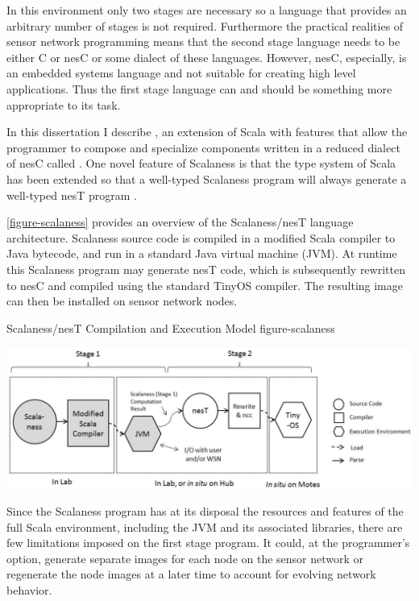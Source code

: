 In this environment only two stages are necessary so a language that provides an arbitrary
number of stages is not required. Furthermore the practical realities of sensor network
programming means that the second stage language needs to be either C or nesC or some dialect of
these languages. However, nesC, especially, is an embedded systems language and not suitable for
creating high level applications. Thus the first stage language can and should be something
more appropriate to its task.

In this dissertation I describe , an extension of Scala \cite{PiS2} with
features that allow the programmer to compose and specialize components written in a reduced
dialect of nesC called . One novel feature of Scalaness is that the type system of
Scala has been extended so that a well-typed Scalaness program will always generate a well-typed
nesT program \cite{chapin-GPCE-2013}.

\autoref{figure-scalaness} provides an overview of the Scalaness/nesT language architecture.
Scalaness source code is compiled in a modified Scala compiler to Java bytecode, and run in a
standard Java virtual machine (JVM). At runtime this Scalaness program may generate nesT code,
which is subsequently rewritten to nesC and compiled using the standard TinyOS compiler. The
resulting image can then be installed on sensor network nodes.

\begin{fpfig*}[t]
  {Scalaness/nesT Compilation and Execution Model}
  {figure-scalaness}
  \begin{center}
    \includegraphics[scale=.54]{Figures/scalaness.eps}
  \end{center}
\end{fpfig*}

Since the Scalaness program has at its disposal the resources and features of the full Scala
environment, including the JVM and its associated libraries, there are few limitations imposed
on the first stage program. It could, at the programmer's option, generate separate images for
each node on the sensor network or regenerate the node images at a later time to account for
evolving network behavior.

